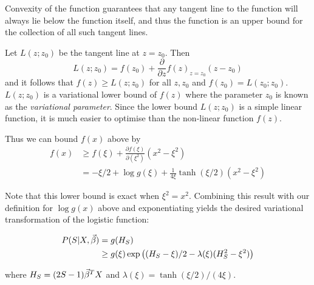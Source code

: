\documentclass{amsart}
\begin{document}
Convexity of the function guarantees that any tangent line to the function will always lie below the
function itself, and thus the function is an upper bound for the collection of all such tangent lines.

Let $L(z;z_0)$ be the tangent line at $z = z_0$. Then
$$
L(z;z_0) = f(z_0) + \frac{\partial}{\partial z} f(z)_{z=z_0} (z - z_0)
$$
and it follows that $f(z) \geq L(z; z_0)$ for all $z, z_0$ and $f(z_0) = L(z_0; z_0)$. $L(z;z_0)$ is a
variational lower bound of $f(z)$ where the parameter $z_0$ is known as the \emph{variational parameter}.
Since the lower bound $L(z; z_0)$ is a simple linear function, it is much easier to optimise than the
non-linear function $f(z)$.

Thus we can bound $f(x)$ above by
\begin{align*}
f(x) &\geq f(\xi) + \frac{\partial f(\xi)}{\partial(\xi^2)} (x^2 - \xi^2) \\
&= -\xi/2 + \log{g(\xi)} + \frac{1}{4 \xi} \tanh{(\xi/2)}(x^2 - \xi^2)
\end{align*}

Note that this lower bound is exact when $\xi^2 = x^2$. Combining this result with our definition for
$\log{g(x)}$ above and exponentiating yields the desired variational transformation of the logistic
function:

\begin{align*}
P(S|X, \vec{\beta}) &= g(H_S) \\
&\geq g(\xi) \exp{\left( (H_S - \xi)/2 - \lambda(\xi)(H_S^2 - \xi^2) \right)}
\end{align*}

where $H_S = (2S - 1)\vec{\beta}^T X$ and $\lambda(\xi) = \tanh{(\xi/2)}/(4 \xi)$.


\end{document}
